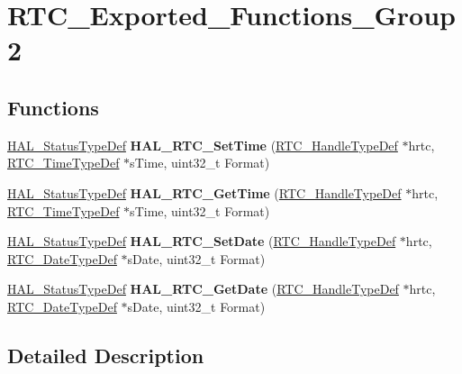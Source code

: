\hypertarget{group___r_t_c___exported___functions___group2}{}\section{R\+T\+C\+\_\+\+Exported\+\_\+\+Functions\+\_\+\+Group2}
\label{group___r_t_c___exported___functions___group2}
\subsection*{Functions}
\begin{DoxyCompactItemize}
\item 
\mbox{\label{group___r_t_c___exported___functions___group2_gafe0fed98171a564decd2a6c9be9781d8}} 
\hyperlink{stm32f4xx__hal__def_8h_a63c0679d1cb8b8c684fbb0632743478f}{H\+A\+L\+\_\+\+Status\+Type\+Def} {\bfseries H\+A\+L\+\_\+\+R\+T\+C\+\_\+\+Set\+Time} (\hyperlink{struct_r_t_c___handle_type_def}{R\+T\+C\+\_\+\+Handle\+Type\+Def} $\ast$hrtc, \hyperlink{struct_r_t_c___time_type_def}{R\+T\+C\+\_\+\+Time\+Type\+Def} $\ast$s\+Time, uint32\+\_\+t Format)
\item 
\mbox{\label{group___r_t_c___exported___functions___group2_gae478ca2647e8d2f7dd1828ce43889a9e}} 
\hyperlink{stm32f4xx__hal__def_8h_a63c0679d1cb8b8c684fbb0632743478f}{H\+A\+L\+\_\+\+Status\+Type\+Def} {\bfseries H\+A\+L\+\_\+\+R\+T\+C\+\_\+\+Get\+Time} (\hyperlink{struct_r_t_c___handle_type_def}{R\+T\+C\+\_\+\+Handle\+Type\+Def} $\ast$hrtc, \hyperlink{struct_r_t_c___time_type_def}{R\+T\+C\+\_\+\+Time\+Type\+Def} $\ast$s\+Time, uint32\+\_\+t Format)
\item 
\mbox{\label{group___r_t_c___exported___functions___group2_ga6cf6c70227337a564ccef82f64d6268f}} 
\hyperlink{stm32f4xx__hal__def_8h_a63c0679d1cb8b8c684fbb0632743478f}{H\+A\+L\+\_\+\+Status\+Type\+Def} {\bfseries H\+A\+L\+\_\+\+R\+T\+C\+\_\+\+Set\+Date} (\hyperlink{struct_r_t_c___handle_type_def}{R\+T\+C\+\_\+\+Handle\+Type\+Def} $\ast$hrtc, \hyperlink{struct_r_t_c___date_type_def}{R\+T\+C\+\_\+\+Date\+Type\+Def} $\ast$s\+Date, uint32\+\_\+t Format)
\item 
\mbox{\label{group___r_t_c___exported___functions___group2_ga07ec2e43a305aa55e8c2442a349fc505}} 
\hyperlink{stm32f4xx__hal__def_8h_a63c0679d1cb8b8c684fbb0632743478f}{H\+A\+L\+\_\+\+Status\+Type\+Def} {\bfseries H\+A\+L\+\_\+\+R\+T\+C\+\_\+\+Get\+Date} (\hyperlink{struct_r_t_c___handle_type_def}{R\+T\+C\+\_\+\+Handle\+Type\+Def} $\ast$hrtc, \hyperlink{struct_r_t_c___date_type_def}{R\+T\+C\+\_\+\+Date\+Type\+Def} $\ast$s\+Date, uint32\+\_\+t Format)
\end{DoxyCompactItemize}


\subsection{Detailed Description}
